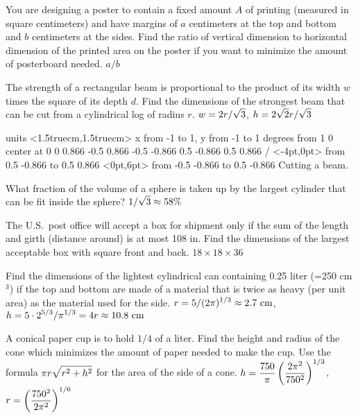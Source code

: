 \exercise You are designing a poster to contain a fixed amount $A$ of
printing (measured in square centimeters) and have margins of $a$
centimeters at the top and bottom and $b$ centimeters at the sides.
Find the ratio of vertical dimension to horizontal dimension of the
printed area on the poster if you want to minimize the amount of
posterboard needed.
\answer $a/b$
\endanswer
\endexercise

\exercise
The strength of a rectangular beam is proportional to the product of its
width $w$ times the square of its depth $d$.  
Find the dimensions of the strongest
beam that can be cut from a cylindrical log of radius $r$.
\answer $\displaystyle w=2r/\sqrt3$, $\displaystyle h=2\sqrt2r/\sqrt3$
\endanswer

\figure
\texonly
\vbox{\beginpicture
\normalgraphs
\ninepoint
\setcoordinatesystem units <1.5truecm,1.5truecm>
\setplotarea x from -1 to 1, y from -1 to 1
 degrees from 1 0 center at 0 0
\setlinear
{} 0.866 -0.5 0.866 -0.5 -0.866 0.5 -0.866 0.5 0.866 /
 <-4pt,0pt> from 0.5 -0.866 to 0.5 0.866
 <0pt,6pt> from -0.5 -0.866 to 0.5 -0.866
\endpicture}
\endtexonly
{}
\begincaption
Cutting a beam.
\endcaption
\endfigure


\endexercise

\exercise
What fraction of the volume of a sphere is taken up by the largest cylinder
that can be fit inside the sphere?
\answer $\displaystyle 1/\sqrt3\approx 58\%$
\endanswer
\endexercise

\exercise
The U.S.~post office will accept a box for shipment only if the sum of the
length and girth (distance around) is at most 108 in.  Find the dimensions
of the largest acceptable box with square front and back.
\answer $18\times18\times36$
\endanswer
\endexercise

\exercise
Find the dimensions of the lightest cylindrical can containing 0.25 liter
(=250 cm${}^3$) if the top and bottom are made of a material that is twice
as heavy (per unit area) as the material used for the side.
\answer $\displaystyle r=5/(2\pi)^{1/3}\approx 2.7\hbox{ cm}$,\hfill\break
$\displaystyle h=5\cdot2^{5/3}/\pi^{1/3}=4r\approx 10.8 \hbox{ cm}$
\endanswer
\endexercise

\exercise A conical paper cup is to hold $1/4$ of a liter. Find the
height and radius of the cone which minimizes
the amount of paper needed to make the cup.  Use the formula $\displaystyle \pi
r\sqrt{r^2+h^2}$ for the area of the side of a cone.
\answer $\displaystyle h={750\over\pi}\left({2\pi^2\over 750^2}\right)^{1/3}$, 
$\displaystyle r=\left({750^2\over 2\pi^2}\right)^{1/6}$
\endanswer
\endexercise

